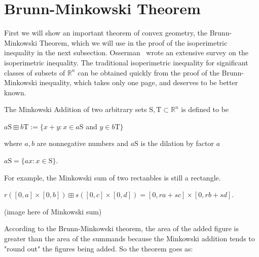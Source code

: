 \documentclass[a4paper]{book}
\numberwithin{theorem}{section}%
\begin{document}
\section{Brunn-Minkowski Theorem}
First we will show an important theorem of convex geometry, the Brunn-Minkowski Theorem, which we will use in the proof of the isoperimetric inequality in the next subsection. Osserman~\citep{osserman1978isoperimetric} wrote an extensive survey on the isoperimetric inequality. The traditional isoperimetric inequality for significant classes of subsets of $\mathbb{R}^{n}$ can be obtained quickly from the proof of the Brunn-Minkowski inequality, which takes only one page, and deserves to be better known.

The Minkowski Addition of two arbitrary sets $\mathrm{S},\mathrm{T}\subset\mathbb{R}^{n}$ is defined to be
\begin{center}
    $a\mathrm{S}\boxplus b\mathrm{T}:=\{x+y:x\in a\mathrm{S}$ and $y\in b\mathrm{T}\}$
\end{center}
where $a,b$ are nonnegative numbers and $a\mathrm{S}$ is the dilation by factor $a$
\begin{center}
    $a\mathrm{S}=\{ax:x\in\mathrm{S}\}$.
\end{center}
For example, the Minkowski sum of two rectanbles is still a rectangle.
\begin{center}
    $r([0,a]\times[0,b])\boxplus s([0,c]\times[0,d])=[0,ra+sc]\times[0,rb+sd]$.
\end{center} 
(image here of Minkowski sum)

According to the Brunn-Minkowski theorem, the area of the added figure is greater than the area of the summands because the Minkowski addition tends to "round out" the figures being added. So the theorem goes as:
\end{document}
